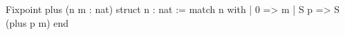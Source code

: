 Fixpoint plus (n m : nat) {struct n} : nat :=
  match n with
  | 0 => m
  | S p => S (plus p m)
  end